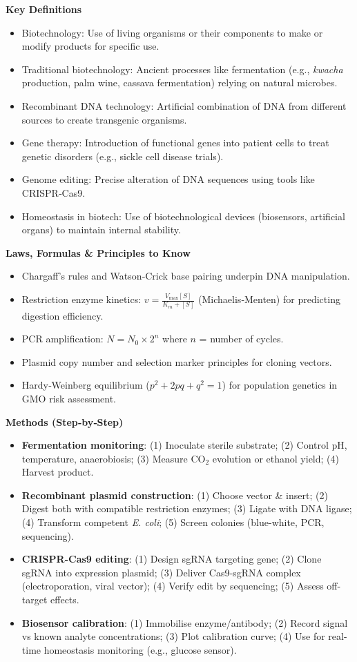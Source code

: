 \documentclass[11pt]{article}
\newcommand{\cle}[1]{{\popxbold\color{popdark}#1}}
\begin{document}
\begin{bilan}
\textbf{Key Definitions}
\begin{itemize}
\item \cle{Biotechnology}: Use of living organisms or their components to make or modify products for specific use.
\item \cle{Traditional biotechnology}: Ancient processes like fermentation (e.g., \emph{kwacha} production, palm wine, cassava fermentation) relying on natural microbes.
\item \cle{Recombinant DNA technology}: Artificial combination of DNA from different sources to create transgenic organisms.
\item \cle{Gene therapy}: Introduction of functional genes into patient cells to treat genetic disorders (e.g., sickle cell disease trials).
\item \cle{Genome editing}: Precise alteration of DNA sequences using tools like CRISPR‑Cas9.
\item \cle{Homeostasis in biotech}: Use of biotechnological devices (biosensors, artificial organs) to maintain internal stability.
\end{itemize}

\textbf{Laws, Formulas \& Principles to Know}
\begin{itemize}
\item \cle{Chargaff’s rules} and \cle{Watson‑Crick base pairing} underpin DNA manipulation.
\item \cle{Restriction enzyme kinetics}: $v = \frac{V_{\max}[S]}{K_m + [S]}$ (Michaelis‑Menten) for predicting digestion efficiency.
\item \cle{PCR amplification}: $N = N_0 \times 2^n$ where $n$ = number of cycles.
\item \cle{Plasmid copy number} and \cle{selection marker} principles for cloning vectors.
\item \cle{Hardy‑Weinberg equilibrium} ($p^2+2pq+q^2=1$) for population genetics in GMO risk assessment.
\end{itemize}

\textbf{Methods (Step‑by‑Step)}
\begin{itemize}
\item \textbf{Fermentation monitoring}: (1) Inoculate sterile substrate; (2) Control pH, temperature, anaerobiosis; (3) Measure CO$_2$ evolution or ethanol yield; (4) Harvest product.
\item \textbf{Recombinant plasmid construction}: (1) Choose vector \& insert; (2) Digest both with compatible restriction enzymes; (3) Ligate with DNA ligase; (4) Transform competent \emph{E. coli}; (5) Screen colonies (blue-white, PCR, sequencing).
\item \textbf{CRISPR-Cas9 editing}: (1) Design sgRNA targeting gene; (2) Clone sgRNA into expression plasmid; (3) Deliver Cas9-sgRNA complex (electroporation, viral vector); (4) Verify edit by sequencing; (5) Assess off-target effects.
\item \textbf{Biosensor calibration}: (1) Immobilise enzyme/antibody; (2) Record signal vs known analyte concentrations; (3) Plot calibration curve; (4) Use for real-time homeostasis monitoring (e.g., glucose sensor).
\end{itemize}


\end{bilan}
\end{document}
